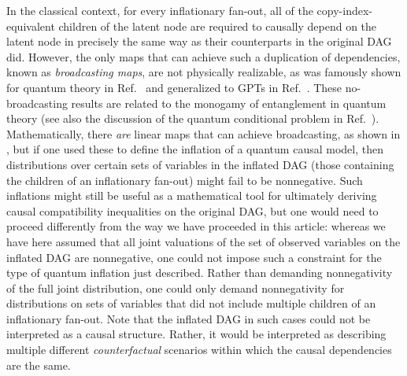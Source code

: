 In the classical context, for every inflationary fan-out, all of the copy-index-equivalent children of the latent node are required to causally depend on the latent node in precisely the same way as their counterparts in the original DAG did.  However, the only maps that can achieve such a duplication of dependencies, known as {\em broadcasting maps}, are not physically realizable, as was famously shown for quantum theory in Ref.~\cite{NoCloningQuantum1996} and generalized to GPTs in Ref.~\cite{NoCloningGeneral2006}.  These no-broadcasting results are related to the monogamy of entanglement in quantum theory \cite{wootters2001monogomy,winter2004monogomy} (see also the discussion of the quantum conditional problem in Ref.~\cite{leifer2013conditionalstates}).  Mathematically, there {\em are} linear maps that can achieve broadcasting, as shown in \cite{Coecke2011}, but if one used these to define the inflation of a quantum causal model, then distributions over certain sets of variables in the inflated DAG (those containing the children of an inflationary fan-out) might fail to be nonnegative.  Such inflations might still be useful as a mathematical tool for ultimately deriving causal compatibility inequalities on the original DAG, but one would need to proceed differently from the way we have proceeded in this article: whereas we have here assumed that all joint valuations of the set of observed variables on the inflated DAG are nonnegative, one could not impose such a constraint for the type of quantum inflation just described.  Rather than demanding nonnegativity of the full joint distribution, one could only demand nonnegativity for distributions on sets of variables that did not include multiple children of an inflationary fan-out.  Note that the inflated DAG in such cases could not be interpreted as a causal structure.  Rather, it would be interpreted as describing multiple different {\em counterfactual} scenarios within which the causal dependencies are the same. 


